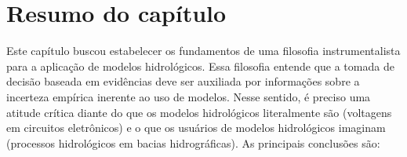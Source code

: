 \documentclass[./main.tex]{subfiles}
\begin{document}
\clearpage

\section{Resumo do capítulo}\label{episteme:summary}

\par Este capítulo buscou estabelecer os fundamentos de uma filosofia instrumentalista para a aplicação de modelos hidrológicos. Essa filosofia entende que a tomada de decisão baseada em evidências deve ser auxiliada por informações sobre a incerteza empírica inerente ao uso de modelos. Nesse sentido, é preciso uma atitude crítica diante do que os modelos hidrológicos literalmente são (voltagens em circuitos eletrônicos) e o que os usuários de modelos hidrológicos imaginam (processos hidrológicos em bacias hidrográficas). As principais conclusões são:
\end{document}

